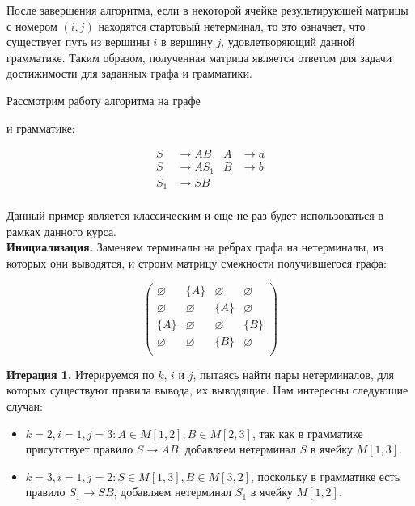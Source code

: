 После завершения алгоритма, если в некоторой ячейке результируюшей матрицы с номером $(i, j)$ находятся стартовый нетерминал, то это означает, что существует путь из вершины $i$ в вершину $j$, удовлетворяющий данной грамматике. Таким образом, полученная матрица является ответом для задачи достижимости для заданных графа и грамматики.

\begin{example}
\label{CYK_algorithm_ex}
Рассмотрим работу алгоритма на графе

\begin{center}
  
\end{center}

и грамматике:

\begin{align*}
S   & \to A B    & A   & \to a     \\
S   & \to A S_1  & B   & \to b\\
S_1 & \to S B   &&\\
\end{align*}

Данный пример является классическим и еще не раз будет использоваться в рамках данного курса. \\

\textbf{Инициализация.}
Заменяем терминалы на ребрах графа на нетерминалы, из которых они выводятся, и строим матрицу смежности получившегося графа:

\begin{center}
  
\end{center}

\[
\begin{pmatrix}
\varnothing & \{A\}       & \varnothing & \varnothing \\
\varnothing & \varnothing & \{A\}       & \varnothing \\
\{A\}       & \varnothing & \varnothing & \{B\}       \\
\varnothing & \varnothing & \{B\}       & \varnothing \\
\end{pmatrix}
\]

\textbf{Итерация 1.}
Итерируемся по $k$, $i$ и $j$, пытаясь найти пары нетерминалов, для которых существуют правила вывода, их выводящие. Нам интересны следующие случаи:

\begin{itemize}
    \item $k = 2, i = 1, j = 3: A \in M[1, 2], B \in M[2, 3]$, так как в грамматике присутствует правило $S \to A B$, добавляем нетерминал $S$ в ячейку $M[1, 3]$.
    \item $k = 3, i = 1, j = 2: S \in M[1, 3], B \in M[3, 2]$, поскольку в грамматике есть правило $S_1 \to S B$, добавляем нетерминал $S_1$ в ячейку $M[1, 2]$.
\end{itemize}


\end{example}
